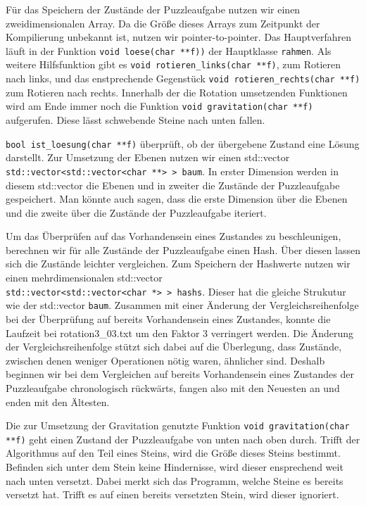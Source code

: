 	Für das Speichern der Zustände der Puzzleaufgabe nutzen wir einen zweidimensionalen Array. 
	Da die Größe dieses Arrays zum Zeitpunkt der Kompilierung unbekannt ist, nutzen wir pointer-to-pointer.
	Das Hauptverfahren läuft in der Funktion \texttt{void loese(char **f))} der Hauptklasse \texttt{rahmen}.
  Als weitere Hilfsfunktion gibt es \texttt{void rotieren\_links(char **f)}, zum Rotieren nach links, 
	und das enstprechende Gegenstück \texttt{void rotieren\_rechts(char **f)} zum Rotieren nach rechts.
	Innerhalb der die Rotation umsetzenden Funktionen wird am Ende immer noch die Funktion \texttt{void gravitation(char **f)} aufgerufen.
	Diese lässt schwebende Steine nach unten fallen. 
	
	\texttt{bool ist\_loesung(char **f)} überprüft, ob der übergebene Zustand eine Lösung darstellt.
	Zur Umsetzung der Ebenen nutzen wir einen std::vector \\\texttt{std::vector<std::vector<char **> > baum}.
	In erster Dimension werden in diesem std::vector die Ebenen und in zweiter die Zustände der Puzzleaufgabe gespeichert. 
	Man könnte auch sagen, dass die erste Dimension über die Ebenen und die zweite über die Zustände der Puzzleaufgabe iteriert.

	Um das Überprüfen auf das Vorhandensein eines Zustandes zu beschleunigen, berechnen wir für alle Zustände der Puzzleaufgabe einen Hash.
	Über diesen lassen sich  die Zustände leichter vergleichen. Zum Speichern der Hashwerte nutzen 
	wir einen mehrdimensionalen std::vector \\\texttt{std::vector<std::vector<char *> > hashs}. Dieser hat die gleiche Strukutur wie der std::vector \texttt{baum}.
	 Zusammen mit einer Änderung der Vergleichsreihenfolge
	bei der Überprüfung auf bereits Vorhandensein eines Zustandes, konnte die Laufzeit bei rotation3\_03.txt um den Faktor 3 verringert werden.
	Die Änderung der Vergleichsreihenfolge stützt sich dabei auf die Überlegung, dass Zustände, zwischen denen weniger Operationen nötig waren, ähnlicher sind.
	Deshalb beginnen wir bei dem Vergleichen auf bereits Vorhandensein eines Zustandes der Puzzleaufgabe chronologisch rückwärts, 
	fangen also mit den Neuesten an und enden mit den Ältesten.

	Die zur Umsetzung der Gravitation genutzte Funktion \texttt{void gravitation(char **f)} geht einen Zustand der Puzzleaufgabe von unten nach oben durch.
	Trifft der Algorithmus auf den Teil eines Steins, wird die Größe dieses Steins bestimmt. Befinden sich unter dem Stein keine Hindernisse, 
	wird dieser ensprechend weit nach unten versetzt. Dabei merkt sich das Programm, welche Steine es bereits versetzt hat. 
	Trifft es auf einen bereits versetzten Stein, wird dieser ignoriert.

 
	
	
